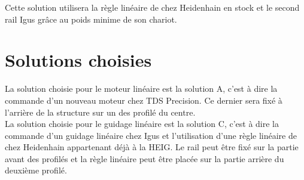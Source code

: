 \begin{table}[H]
    \centering
    \caption{Offres pour le guidage}
    \label{tab:OffreGuid}
\end{table}

Cette solution utilisera la règle linéaire de chez Heidenhain en stock et le second rail Igus grâce au poids minime de son chariot.

\section{Solutions choisies}\label{sec:SolChoix}

La solution choisie pour le moteur linéaire est la solution A, c'est à dire la commande d'un nouveau moteur chez TDS Precision. Ce dernier
sera fixé à l'arrière de la structure sur un des profilé du centre.\\

La solution choisie pour le guidage linéaire est la solution C, c'est à dire la commande d'un guidage linéaire chez Igus et l'utilisation d'une
règle linéaire de chez Heidenhain appartenant déjà à la HEIG. Le rail peut être fixé sur la partie avant des profilés et la règle linéaire peut
être placée sur la partie arrière du deuxième profilé.